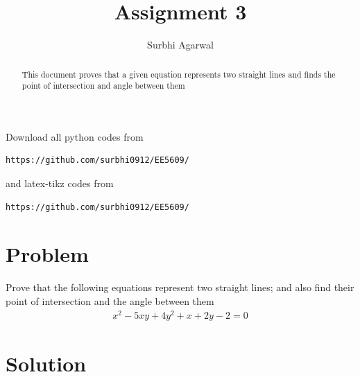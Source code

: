 \documentclass[journal,12pt,twocolumn]{IEEEtran}
\begin{document}
\let\StandardTheFigure\thefigure
\let\vec\mathbf

\renewcommand{\thefigure}{\theproblem}

\def\putbox#1#2#3{\makebox[0in][l]{\makebox[#1][l]{}\raisebox{\baselineskip}[0in][0in]{\raisebox{#2}[0in][0in]{#3}}}}
     \def\rightbox#1{\makebox[0in][r]{#1}}
     \def\centbox#1{\makebox[0in]{#1}}
     \def\topbox#1{\raisebox{-\baselineskip}[0in][0in]{#1}}
     \def\midbox#1{\raisebox{-0.5\baselineskip}[0in][0in]{#1}}
\vspace{3cm}

\title{Assignment 3}
\author{Surbhi Agarwal}

\maketitle

\newpage


\bigskip

\renewcommand{\thefigure}{\theenumi}
\renewcommand{\thetable}{\theenumi}

\begin{abstract}
This document proves that a given equation represents two straight lines and finds the point of intersection and angle between them
\end{abstract}

Download all python codes from 
%
\begin{lstlisting}
https://github.com/surbhi0912/EE5609/
\end{lstlisting}
%
and latex-tikz codes from 
%
\begin{lstlisting}
https://github.com/surbhi0912/EE5609/
\end{lstlisting}
%
\section{Problem}
Prove that the following equations represent two straight lines; and also find their point of intersection and the angle between them
\begin{align}\nonumber
    x^2-5xy+4y^2+x+2y-2=0
\end{align}
\section{Solution}
\end{document}
